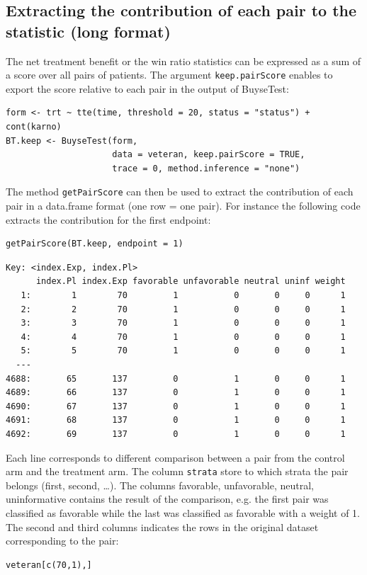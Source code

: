 \documentclass[12pt]{article}
\begin{document}
\subsection{Extracting the contribution of each pair to the statistic (long format)}
\label{sec:orga95f057}
The net treatment benefit or the win ratio statistics can be expressed as a sum
of a score over all pairs of patients. The argument \texttt{keep.pairScore}
enables to export the score relative to each pair in the output of
BuyseTest:
\lstset{language=r,label= ,caption= ,captionpos=b,numbers=none}
\begin{lstlisting}
form <- trt ~ tte(time, threshold = 20, status = "status") + cont(karno)
BT.keep <- BuyseTest(form,
                     data = veteran, keep.pairScore = TRUE, 
                     trace = 0, method.inference = "none")
\end{lstlisting}

The method \texttt{getPairScore} can then be used to extract the contribution
of each pair in a data.frame format (one row = one pair). For instance
the following code extracts the contribution for the first endpoint:
\lstset{language=r,label= ,caption= ,captionpos=b,numbers=none}
\begin{lstlisting}
getPairScore(BT.keep, endpoint = 1)
\end{lstlisting}

\begin{verbatim}
Key: <index.Exp, index.Pl>
      index.Pl index.Exp favorable unfavorable neutral uninf weight
   1:        1        70         1           0       0     0      1
   2:        2        70         1           0       0     0      1
   3:        3        70         1           0       0     0      1
   4:        4        70         1           0       0     0      1
   5:        5        70         1           0       0     0      1
  ---                                                              
4688:       65       137         0           1       0     0      1
4689:       66       137         0           1       0     0      1
4690:       67       137         0           1       0     0      1
4691:       68       137         0           1       0     0      1
4692:       69       137         0           1       0     0      1
\end{verbatim}

Each line corresponds to different comparison between a pair from the
control arm and the treatment arm. The column \texttt{strata} store to which
strata the pair belongs (first, second, \ldots{}). The columns favorable,
unfavorable, neutral, uninformative contains the result of the
comparison, e.g. the first pair was classified as favorable while the
last was classified as favorable with a weight of 1. The second and
third columns indicates the rows in the original dataset corresponding
to the pair:
\lstset{language=r,label= ,caption= ,captionpos=b,numbers=none}
\begin{lstlisting}
veteran[c(70,1),]
\end{lstlisting}
\end{document}
